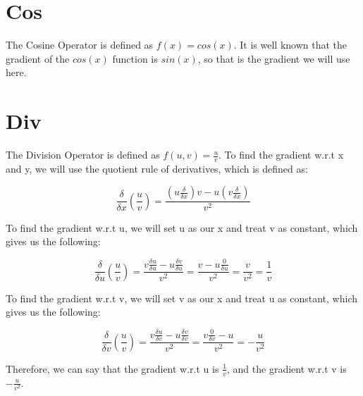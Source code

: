 \documentclass{article}
\begin{document}
\noindent\makebox[\linewidth]{\rule{\paperwidth}{0.4pt}}
    \section{Cos}
        The Cosine Operator is defined as $f(x) = cos(x)$. It is well known that the gradient of the $cos(x)$ function
        is $sin(x)$, so that is the gradient we will use here.

\noindent\makebox[\linewidth]{\rule{\paperwidth}{0.4pt}}
    \section{Div}
        The Division Operator is defined as $f(u, v) = \frac{u}{v}$. To find the gradient w.r.t x and y, we will
        use the quotient rule of derivatives, which is defined as:

        $$\frac{\delta}{\delta{x}}(\frac{u}{v}) = \frac{(u\frac{\delta}{\delta{x}})v - u(v\frac{\delta}{\delta{x}})}{v^2}$$

        To find the gradient w.r.t u, we will set u as our x and treat v as constant, which gives us the following:

        $$\frac{\delta}{\delta{u}}(\frac{u}{v}) = \frac{v\frac{\delta{u}}{\delta{u}} - u\frac{\delta{v}}{\delta{u}}}{v^2} 
        = \frac{v - u\frac{0}{\delta{u}}}{v^2} = \frac{v}{v^2} = \frac{1}{v}$$

        To find the gradient w.r.t v, we will set v as our x and treat u as constant, which gives us the following:

        $$\frac{\delta}{\delta{v}}(\frac{u}{v}) = \frac{v\frac{\delta{u}}{\delta{v}} - u\frac{\delta{v}}{\delta{v}}}{v^2} 
        = \frac{v\frac{0}{\delta{v}} - u}{v^2} = -\frac{u}{v^2}$$

        Therefore, we can say that the gradient w.r.t u is $\frac{1}{v}$, and the gradient w.r.t v is $-\frac{u}{v^2}$.

\noindent\makebox[\linewidth]{\rule{\paperwidth}{0.4pt}}
\end{document}
